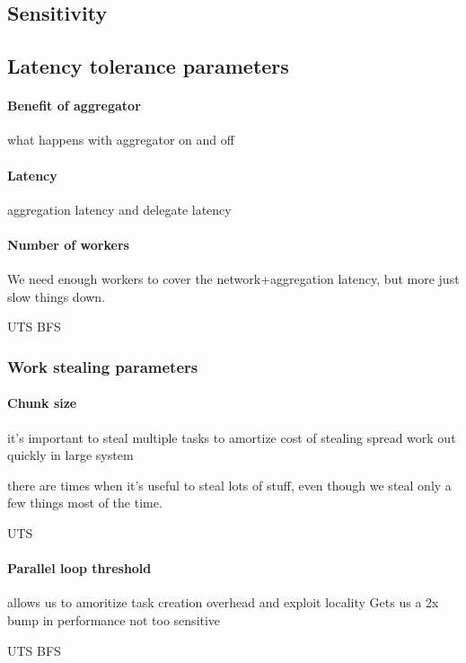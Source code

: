 \subsection{Sensitivity}

\subsection{Latency tolerance parameters}

\paragraph{Benefit of aggregator}
what happens with aggregator on and off

\paragraph{Latency}
aggregation latency and delegate latency


\paragraph{Number of workers}
We need enough workers to cover the network+aggregation latency, but more just slow things down.

UTS
BFS


\subsubsection{Work stealing parameters}

\paragraph{Chunk size}

it's important to steal multiple tasks to 
amortize cost of stealing
spread work out quickly in large system

there are times when it's useful to steal lots of stuff, even though
we steal only a few things most of the time.

UTS


\paragraph{Parallel loop threshold}

allows us to amoritize task creation overhead and exploit locality
Gets us a 2x bump in performance
not too sensitive

UTS
BFS
